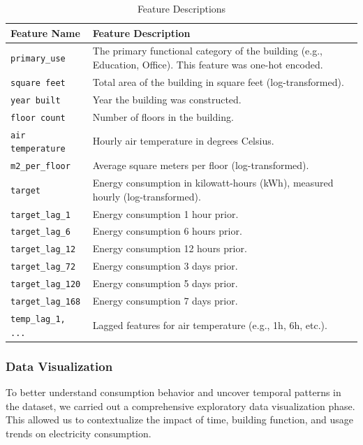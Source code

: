 \begin{table}[!h]
\centering
\caption{Feature Descriptions}
\label{tab:feature_descriptions}
\begin{tabular}{|>{\raggedright\arraybackslash}p{2cm}|>{\raggedright\arraybackslash}p{5cm}|}
\hline
\textbf{Feature Name} & \textbf{Feature Description} \\
\hline
\texttt{primary\_use} & The primary functional category of the building (e.g., Education, Office). This feature was one-hot encoded. \\
\texttt{square feet} & Total area of the building in square feet (log-transformed). \\
\texttt{year built} & Year the building was constructed. \\
\texttt{floor count} & Number of floors in the building. \\
\texttt{air temperature} & Hourly air temperature in degrees Celsius. \\
\texttt{m2\_per\_floor} & Average square meters per floor (log-transformed). \\
\texttt{target} & Energy consumption in kilowatt-hours (kWh), measured hourly (log-transformed). \\
\texttt{target\_lag\_1} & Energy consumption 1 hour prior. \\
\texttt{target\_lag\_6} & Energy consumption 6 hours prior. \\
\texttt{target\_lag\_12} & Energy consumption 12 hours prior. \\
\texttt{target\_lag\_72} & Energy consumption 3 days prior. \\
\texttt{target\_lag\_120} & Energy consumption 5 days prior. \\
\texttt{target\_lag\_168} & Energy consumption 7 days prior. \\
\texttt{temp\_lag\_1, ...} & Lagged features for air temperature (e.g., 1h, 6h, etc.). \\
\hline
\end{tabular}
\end{table}


\subsubsection{Data Visualization}

To better understand consumption behavior and uncover temporal patterns in the dataset, we carried out a comprehensive exploratory data visualization phase. This allowed us to contextualize the impact of time, building function, and usage trends on electricity consumption.

